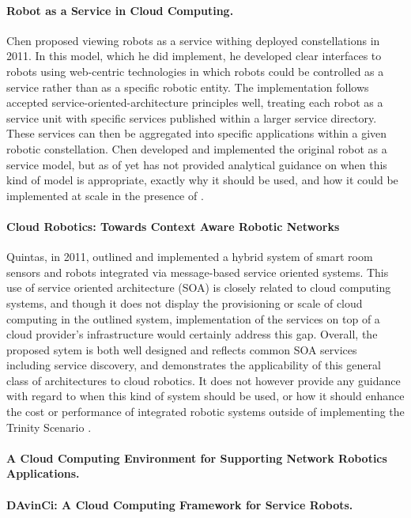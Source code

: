 \documentclass[10pt,letterpaper]{article}
\begin{document}
\paragraph{Robot as a Service in Cloud Computing.}
Chen proposed viewing robots as a service withing deployed constellations in 2011.  In this model, which he did implement, he developed clear interfaces to robots using web-centric technologies in which robots could be controlled as a service rather than as a specific robotic entity. The implementation follows accepted service-oriented-architecture principles well, treating each robot as a service unit with specific services published within a larger service directory.  These services can then be aggregated into specific applications within a given robotic constellation.  Chen developed and implemented the original robot as a service model, but as of yet has not provided analytical guidance on when this kind of model is appropriate, exactly why it should be used, and how it could be implemented at scale in the presence of  \cite{YiZhGa:10}.

\paragraph{Cloud Robotics: Towards Context Aware Robotic Networks}
Quintas, in 2011, outlined and implemented a hybrid system of smart room sensors and robots integrated via message-based service oriented systems.  This use of service oriented architecture (SOA) is closely related to cloud computing systems, and though it does not display the provisioning or scale of cloud computing in the outlined system, implementation of the services on top of a cloud provider's infrastructure would certainly address this gap.  Overall, the proposed sytem is both well designed and reflects common SOA services including service discovery, and demonstrates the applicability of this general class of architectures to cloud robotics.  It does not however provide any guidance with regard to when this kind of system should be used, or how it should enhance the cost or performance of integrated robotic systems outside of implementing the Trinity Scenario \cite{QuMeDi:11}.

\paragraph{A Cloud Computing Environment for Supporting Network Robotics Applications.}

\cite{AgOlFePa:11}

\paragraph{DAvinCi: A Cloud Computing Framework for Service Robots.}

\cite{ArEnLiWu:10}



\end{document}
